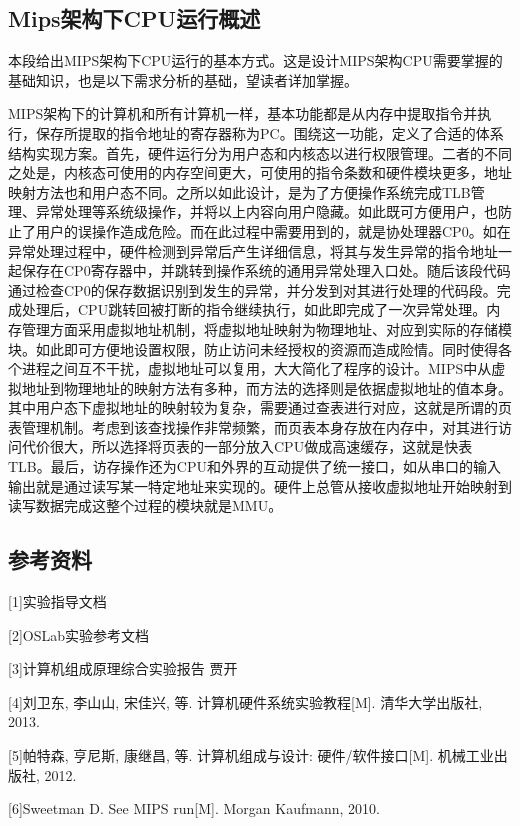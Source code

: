 \subsection{Mips架构下CPU运行概述}
本段给出MIPS架构下CPU运行的基本方式。这是设计MIPS架构CPU需要掌握的基础知识，也是以下需求分析的基础，望读者详加掌握。

MIPS架构下的计算机和所有计算机一样，基本功能都是从内存中提取指令并执行，保存所提取的指令地址的寄存器称为PC。围绕这一功能，定义了合适的体系结构实现方案。首先，硬件运行分为用户态和内核态以进行权限管理。二者的不同之处是，内核态可使用的内存空间更大，可使用的指令条数和硬件模块更多，地址映射方法也和用户态不同。之所以如此设计，是为了方便操作系统完成TLB管理、异常处理等系统级操作，并将以上内容向用户隐藏。如此既可方便用户，也防止了用户的误操作造成危险。而在此过程中需要用到的，就是协处理器CP0。如在异常处理过程中，硬件检测到异常后产生详细信息，将其与发生异常的指令地址一起保存在CP0寄存器中，并跳转到操作系统的通用异常处理入口处。随后该段代码通过检查CP0的保存数据识别到发生的异常，并分发到对其进行处理的代码段。完成处理后，CPU跳转回被打断的指令继续执行，如此即完成了一次异常处理。内存管理方面采用虚拟地址机制，将虚拟地址映射为物理地址、对应到实际的存储模块。如此即可方便地设置权限，防止访问未经授权的资源而造成险情。同时使得各个进程之间互不干扰，虚拟地址可以复用，大大简化了程序的设计。MIPS中从虚拟地址到物理地址的映射方法有多种，而方法的选择则是依据虚拟地址的值本身。其中用户态下虚拟地址的映射较为复杂，需要通过查表进行对应，这就是所谓的页表管理机制。考虑到该查找操作非常频繁，而页表本身存放在内存中，对其进行访问代价很大，所以选择将页表的一部分放入CPU做成高速缓存，这就是快表TLB。最后，访存操作还为CPU和外界的互动提供了统一接口，如从串口的输入输出就是通过读写某一特定地址来实现的。硬件上总管从接收虚拟地址开始映射到读写数据完成这整个过程的模块就是MMU。

\subsection{参考资料}
[1]实验指导文档

[2]OSLab实验参考文档
	
[3]计算机组成原理综合实验报告 贾开

[4]刘卫东, 李山山, 宋佳兴, 等. 计算机硬件系统实验教程[M]. 清华大学出版社, 2013.
	
[5]帕特森, 亨尼斯, 康继昌, 等. 计算机组成与设计: 硬件/软件接口[M]. 机械工业出版社, 2012.
	
[6]Sweetman D. See MIPS run[M]. Morgan Kaufmann, 2010.
